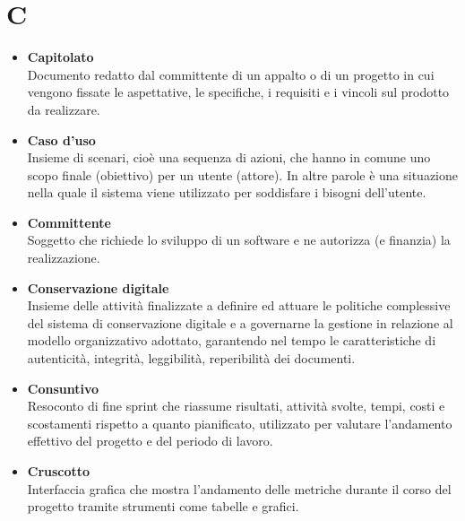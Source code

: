 \documentclass[a4paper,12pt]{article}
\begin{document}
        \section*{C} {
            \begin{itemize}
                \item \textbf{Capitolato}\\
                    Documento redatto dal committente di un appalto o di un progetto in cui vengono fissate le aspettative, le specifiche, i requisiti e i vincoli sul prodotto da realizzare.
                \item \textbf{Caso d'uso}\\
                    Insieme di scenari, cioè una sequenza di azioni, che hanno in comune uno scopo finale (obiettivo) per un utente (attore). In altre parole è una situazione nella quale il sistema viene utilizzato per soddisfare i bisogni dell'utente.
                \item \textbf{Committente}\\
                    Soggetto che richiede lo sviluppo di un software e ne autorizza (e finanzia) la realizzazione.
                \item \textbf{Conservazione digitale}\\
                    Insieme delle attività finalizzate a definire ed attuare le politiche complessive del sistema di conservazione digitale e a governarne la gestione in relazione al modello organizzativo adottato, garantendo nel tempo le caratteristiche di autenticità, integrità, leggibilità, reperibilità dei documenti.
                \item \textbf{Consuntivo}\\
                    Resoconto di fine sprint che riassume risultati, attività svolte, tempi, costi e scostamenti rispetto a quanto pianificato, utilizzato per valutare l'andamento effettivo del progetto e del periodo di lavoro.
                \item \textbf{Cruscotto}\\
                    Interfaccia grafica che mostra l'andamento delle metriche durante il corso del progetto tramite strumenti come tabelle e grafici.
            \end{itemize}
        }
        \newpage
\end{document}
